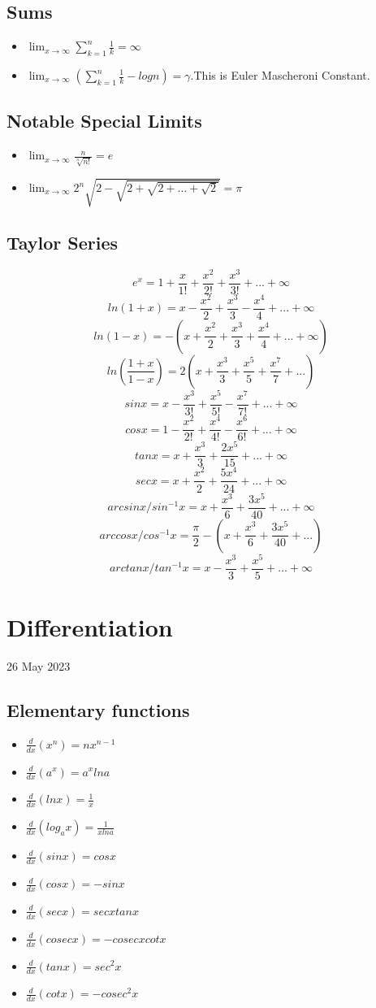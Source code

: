 \documentclass[12pt]{article}
\begin{document}
\subsection{Sums}
\begin{itemize}
\item $\lim_{x \to \infty} \sum_{k=1}^{n} \frac{1}{k}= 
\infty $
\item $\lim_{x \to \infty} (\sum_{k=1}^{n} \frac{1}{k}-logn)= 
\gamma $.This is Euler Mascheroni Constant.
\end{itemize}
\subsection{Notable Special Limits}
\begin{itemize}
\item $\lim_{x \to \infty} \frac{n}{\sqrt[n]{n!}}=e$
\item $\lim_{x \to \infty} 2^n \sqrt{2- \sqrt{2 + \sqrt{2 +...+ \sqrt{2}}}}= \pi $
\end{itemize}
\subsection{Taylor Series}
$$e^x = 1 + \frac{x}{1!}+ \frac{x^{2}}{2!}+ \frac{x^{3}}{3!}+...+ \infty$$
$$ln(1+x) = x - \frac{x^{2}}{2}+ \frac{x^{3}}{3}- \frac{x^{4}}{4}+...+ \infty$$
$$ln(1-x) = -(x + \frac{x^{2}}{2}+ \frac{x^{3}}{3}+ \frac{x^{4}}{4}+...+ \infty)$$
$$ln(\frac{1+x}{1-x}) = 2(x+ \frac{x^{3}}{3}+ \frac{x^{5}}{5}+ \frac{x^{7}}{7}+...)$$
$$sinx = x - \frac{x^{3}}{3!}+ \frac{x^{5}}{5!}- \frac{x^{7}}{7!}+...+ \infty$$
$$cosx = 1 - \frac{x^{2}}{2!}+ \frac{x^{4}}{4!}- \frac{x^{6}}{6!}+...+ \infty$$
$$tanx = x + \frac{x^{3}}{3}+ \frac{2x^{5}}{15}+...+ \infty$$
$$secx = x + \frac{x^{2}}{2}+ \frac{5x^{4}}{24}+...+ \infty$$
$$arcsinx/sin^{-1}x = x + \frac{x^{3}}{6}+ \frac{3x^{5}}{40}+...+ \infty$$
$$arccosx/cos^{-1}x = \frac{\pi}{2}- (x + \frac{x^{3}}{6}+ \frac{3x^{5}}{40}+...)$$
$$arctanx/tan^{-1}x = x - \frac{x^{3}}{3}+ \frac{x^{5}}{5}+...+ \infty$$
\section{Differentiation}
26 May 2023
\subsection{Elementary functions}
\begin{itemize}
\item $\frac{d}{dx} (x^n)=nx^{n-1}$
\item $\frac{d}{dx} (a^x)=a^x lna$
\item $\frac{d}{dx} (lnx)=\frac{1}{x}$
\item $\frac{d}{dx} (log_a x)=\frac{1}{xlna}$
\item $\frac{d}{dx} (sinx)=cosx$
\item $\frac{d}{dx} (cosx)=-sinx$
\item $\frac{d}{dx} (secx)=secxtanx$
\item $\frac{d}{dx} (cosecx)=-cosecxcotx$
\item $\frac{d}{dx} (tanx)=sec^2x$
\item $\frac{d}{dx} (cotx)=-cosec^2x$
\end{itemize}
\end{document}
